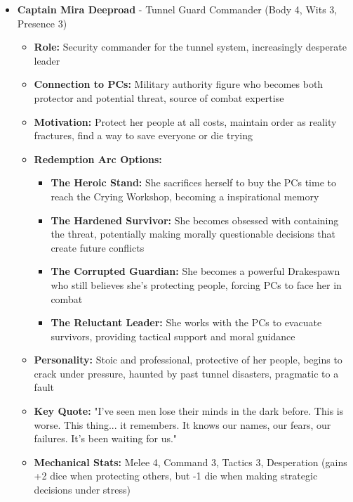 \documentclass[11pt]{article}
\begin{document}
\begin{itemize}
\item \textbf{Captain Mira Deeproad} - Tunnel Guard Commander (Body 4, Wits 3, Presence 3)
  \begin{itemize}
  \item \textbf{Role:} Security commander for the tunnel system, increasingly desperate leader
  \item \textbf{Connection to PCs:} Military authority figure who becomes both protector and potential threat, source of combat expertise
  \item \textbf{Motivation:} Protect her people at all costs, maintain order as reality fractures, find a way to save everyone or die trying
  \item \textbf{Redemption Arc Options:}
    \begin{itemize}
    \item \textbf{The Heroic Stand:} She sacrifices herself to buy the PCs time to reach the Crying Workshop, becoming a inspirational memory
    \item \textbf{The Hardened Survivor:} She becomes obsessed with containing the threat, potentially making morally questionable decisions that create future conflicts
    \item \textbf{The Corrupted Guardian:} She becomes a powerful Drakespawn who still believes she's protecting people, forcing PCs to face her in combat
    \item \textbf{The Reluctant Leader:} She works with the PCs to evacuate survivors, providing tactical support and moral guidance
    \end{itemize}
  \item \textbf{Personality:} Stoic and professional, protective of her people, begins to crack under pressure, haunted by past tunnel disasters, pragmatic to a fault
  \item \textbf{Key Quote:} "I've seen men lose their minds in the dark before. This is worse. This thing... it remembers. It knows our names, our fears, our failures. It's been waiting for us."
  \item \textbf{Mechanical Stats:} Melee 4, Command 3, Tactics 3, Desperation (gains +2 dice when protecting others, but -1 die when making strategic decisions under stress)
  \end{itemize}
\end{itemize}
\end{document}
